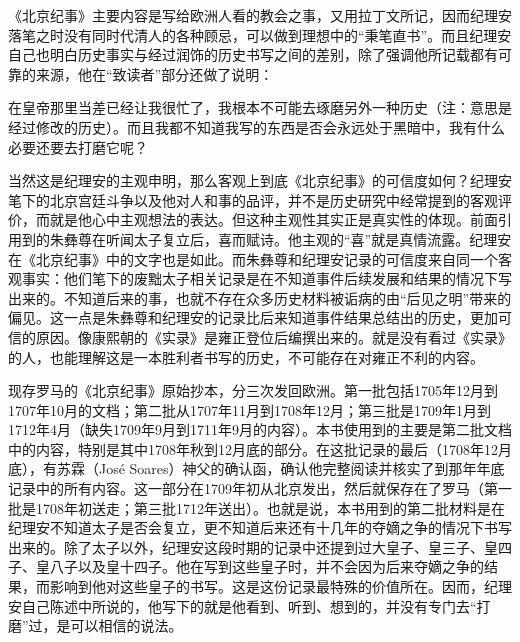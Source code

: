 
《北京纪事》主要内容是写给欧洲人看的教会之事，又用拉丁文所记，因而纪理安落笔之时没有同时代清人的各种顾忌，可以做到理想中的“秉笔直书”。而且纪理安自己也明白历史事实与经过润饰的历史书写之间的差别，除了强调他所记载都有可靠的来源，他在“致读者”部分还做了说明：



\begin{bookquote}在皇帝那里当差已经让我很忙了，我根本不可能去琢磨另外一种历史（注：意思是经过修改的历史）。而且我都不知道我写的东西是否会永远处于黑暗中，我有什么必要还要去打磨它呢？\end{bookquote}


当然这是纪理安的主观申明，那么客观上到底《北京纪事》的可信度如何？纪理安笔下的北京宫廷斗争以及他对人和事的品评，并不是历史研究中经常提到的客观评价，而就是他心中主观想法的表达。但这种主观性其实正是真实性的体现。前面引用到的朱彝尊在听闻太子复立后，喜而赋诗。他主观的“喜”就是真情流露。纪理安在《北京纪事》中的文字也是如此。而朱彝尊和纪理安记录的可信度来自同一个客观事实：他们笔下的废黜太子相关记录是在不知道事件后续发展和结果的情况下写出来的。不知道后来的事，也就不存在众多历史材料被诟病的由“后见之明”带来的偏见。这一点是朱彝尊和纪理安的记录比后来知道事件结果总结出的历史，更加可信的原因。像康熙朝的《实录》是雍正登位后编撰出来的。就是没有看过《实录》的人，也能理解这是一本胜利者书写的历史，不可能存在对雍正不利的内容。



现存罗马的《北京纪事》原始抄本，分三次发回欧洲。第一批包括1705年12月到1707年10月的文档；第二批从1707年11月到1708年12月；第三批是1709年1月到1712年4月（缺失1709年9月到1711年9月的内容）。本书使用到的主要是第二批文档中的内容，特别是其中1708年秋到12月底的部分。在这批记录的最后（1708年12月底），有苏霖（José Soares）神父的确认函，确认他完整阅读并核实了到那年年底记录中的所有内容。这一部分在1709年初从北京发出，然后就保存在了罗马（第一批是1708年初送走；第三批1712年送出）。也就是说，本书用到的第二批材料是在纪理安不知道太子是否会复立，更不知道后来还有十几年的夺嫡之争的情况下书写出来的。除了太子以外，纪理安这段时期的记录中还提到过大皇子、皇三子、皇四子、皇八子以及皇十四子。他在写到这些皇子时，并不会因为后来夺嫡之争的结果，而影响到他对这些皇子的书写。这是这份记录最特殊的价值所在。因而，纪理安自己陈述中所说的，他写下的就是他看到、听到、想到的，并没有专门去“打磨”过，是可以相信的说法。

